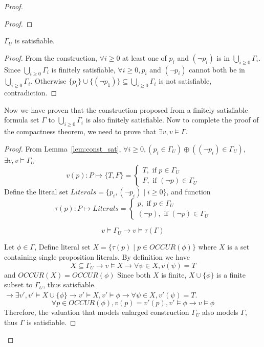 \documentclass{article}
\newtheorem{lemma}[theorem]{Lemma}
\let\oldlemma\lemma
\let\endoldlemma\endlemma
\renewenvironment{lemma}
  {\begin{tcolorbox}[
      colback=green!8,
      colframe=green!50!black,
      boxrule=0.6pt,
      arc=2pt,
      left=6pt,right=6pt,top=4pt,bottom=4pt
    ]\oldlemma}
  {\endoldlemma\end{tcolorbox}}
\begin{document}
\begin{proof}
\begin{proof}
    \end{proof}
    \begin{lemma}\label{lem:const_sat}
        $\Gamma_U$ is satisfiable.
    \end{lemma}
    \begin{proof}
        From the construction, $\forall i \geq 0$ at least one of $p_i$ and $(\neg p_i)$ is in $\bigcup_{i\geq 0} \Gamma_i$. Since $\bigcup_{i\geq 0} \Gamma_i$ is finitely satisfiable, 
        $\forall i \geq 0, p_i$ and $(\neg p_i)$ cannot both be in $\bigcup_{i\geq 0} \Gamma_i$. Otherwise $\{p_i\} \cup \{(\neg p_1)\} \subseteq \bigcup_{i\geq 0} \Gamma_i$ is not satisfiable, contradiction.
    \end{proof}
    Now we have proven that the construction proposed from a finitely satisfiable formula set $\Gamma$ to $\bigcup_{i\geq 0} \Gamma_i$ is also finitely satisfiable. Now to complete the proof of
    the compactness theorem, we need to prove that $\exists v, v\models \Gamma$.
    \begin{proof}
        From Lemma~\ref{lem:const_sat}, 
        $\forall i\geq 0, (p_i \in \Gamma_U) 
        \oplus ((\neg p_i) \in \Gamma_U)$, $\exists v, v \models \Gamma_U$
        \[v(p):P \mapsto \{T, F\} = \begin{cases}
            T, \text{ if } p \in \Gamma_U\\
            F, \text{ if } (\neg p) \in \Gamma_U
        \end{cases}\]
        Define the literal set $Literals = \{p_i, (\neg p_i) \mid i \geq 0\}$, 
        and function 
        \[\tau(p): P \mapsto Literals = \begin{cases}
            p, \text{ if } p \in \Gamma_U\\
            (\neg p), \text{ if } (\neg p) \in \Gamma_U
        \end{cases}\]
        \begin{lemma}
            \[v\models \Gamma_U \rightarrow v \models \tau(\Gamma)\]
        \end{lemma}
        Let $\phi \in \Gamma$, Define literal set $X = \{\tau(p) \mid p \in OCCUR(\phi)\}$
        where $X$ is a set containing single proposition literals. 
        By definition we have 
        \[X \subseteq \Gamma_U \rightarrow v \models X \rightarrow \forall \psi \in X, v(\psi) = T\]
        and $OCCUR(X) = OCCUR(\phi)$
        Since both $X$ is finite, $X \cup \{\phi\}$ is a finite subset to $\Gamma_U$, thus satisfiable. 
        $\rightarrow \exists v', v' \models X\cup \{\phi\} \rightarrow v' \models X, v' \models \phi \rightarrow
        \forall \psi \in X, v'(\psi) = T$. 
        \[\forall p \in OCCUR(\phi), v(p) = v'(p), v' \models \phi \rightarrow v\models \phi\]
        Therefore, the valuation that models enlarged construction $\Gamma_U$ also models $\Gamma$, thus $\Gamma$ 
        is satisfiable.
    \end{proof}
\end{proof}
\end{document}
